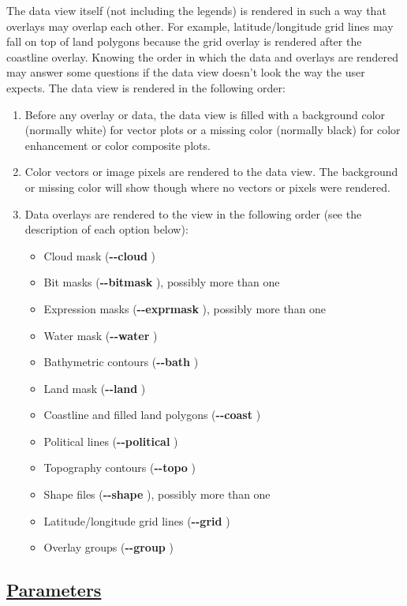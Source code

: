  The data view itself (not including the legends) is rendered in such a way that overlays may overlap each other. For example, latitude/longitude grid lines may fall on top of land polygons because the grid overlay is rendered after the coastline overlay. Knowing the order in which the data and overlays are rendered may answer some questions if the data view doesn't look the way the user expects. The data view is rendered in the following order: \begin{enumerate}
\item Before any overlay or data, the data view is filled with a background color (normally white) for vector plots or a missing color (normally black) for color enhancement or color composite plots.
\item Color vectors or image pixels are rendered to the data view. The background or missing color will show though where no vectors or pixels were rendered.
\item Data overlays are rendered to the view in the following order (see the description of each option below): \begin{itemize}
\item Cloud mask (\textbf{-{-}cloud}
)
\item Bit masks (\textbf{-{-}bitmask}
), possibly more than one
\item Expression masks (\textbf{-{-}exprmask}
), possibly more than one
\item Water mask (\textbf{-{-}water}
)
\item Bathymetric contours (\textbf{-{-}bath}
)
\item Land mask (\textbf{-{-}land}
)
\item Coastline and filled land polygons (\textbf{-{-}coast}
)
\item Political lines (\textbf{-{-}political}
)
\item Topography contours (\textbf{-{-}topo}
)
\item Shape files (\textbf{-{-}shape}
), possibly more than one
\item Latitude/longitude grid lines (\textbf{-{-}grid}
)
\item Overlay groups (\textbf{-{-}group}
)

\end{itemize}


\end{enumerate}

\subsection*{\underline{Parameters}}
